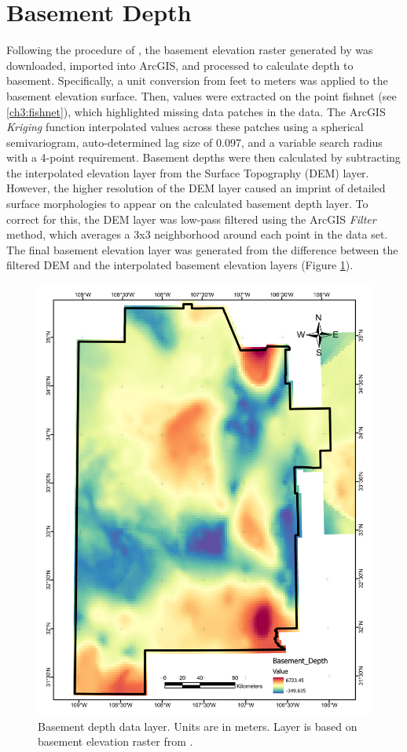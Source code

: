 \section{Basement Depth}\label{app:dl_basement_depth}
Following the procedure of \citet{pepin_new_2018}, the basement elevation raster generated by \citet{bielicki_hydrogeolgic_2015} was downloaded, imported into ArcGIS, and processed to calculate depth to basement. Specifically, a unit conversion from feet to meters was applied to the basement elevation surface. Then, values were extracted on the point fishnet (see \ref{ch3:fishnet}), which highlighted missing data patches in the data. The ArcGIS \textit{Kriging} function interpolated values across these patches using a spherical semivariogram, auto-determined lag size of 0.097, and a variable search radius with a 4-point requirement. Basement depths were then calculated by subtracting the interpolated elevation layer from the Surface Topography (DEM) layer. However, the higher resolution of the DEM layer caused an imprint of detailed surface morphologies to appear on the calculated basement depth layer. To correct for this, the DEM layer was low-pass filtered using the ArcGIS \textit{Filter} method, which averages a 3x3 neighborhood around each point in the data set. The final basement elevation layer was generated from the difference between the filtered DEM and the interpolated basement elevation layers (Figure \ref{fig:feat_basementdepth}).
\vfill
\pagebreak

\begin{figure}[H]
\centering
\includegraphics[width=0.75\linewidth]{templates/images/Figure-BasementDepth.pdf}
\caption[Basement depth data layer]{Basement depth data layer. Units are in meters. Layer is based on basement elevation raster from \protect\citet{bielicki_hydrogeolgic_2015}.}
\label{fig:feat_basementdepth}
\end{figure}
\pagebreak

